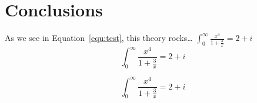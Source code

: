 %
\chapter{Conclusions}
\label{sec:conclusions}


\Blindtext[1][1]


As we see in Equation~\ref{equ:test}, this theory rocks\ldots
$\int_0^\infty{\frac{x^4}{1+\frac{3}{x}}}=2+i$
\[\int_0^\infty{\frac{x^4}{1+\frac{3}{x}}}=2+i\]

\begin{equation}
 \int_0^\infty{\frac{x^4}{1+\frac{3}{x}}}=2+i
 \label{equ:test}
\end{equation}


\Blindtext[2][1]
